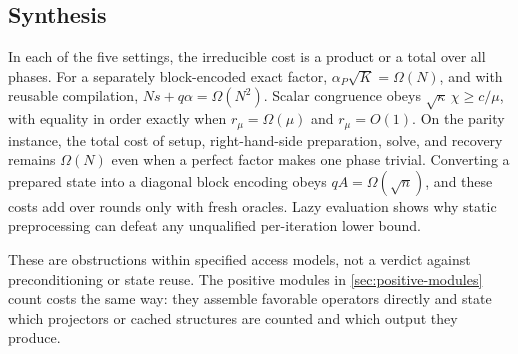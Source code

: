 \subsection{Synthesis}
\label{sec:preconditioning-synthesis}

In each of the five settings, the irreducible cost is a product or a total
over all phases.  For a separately
block-encoded exact factor, $\alpha_P\sqrt K=\Omega(N)$, and with reusable
compilation, $Ns+q\alpha=\Omega(N^2)$.  Scalar congruence
obeys $\sqrt\kappa\,\chi\geq c/\mu$, with equality in order exactly when
$r_\mu=\Omega(\mu)$ and $r_\mu=O(1)$.  On the parity instance, the total
cost of setup, right-hand-side preparation, solve, and recovery remains
$\Omega(N)$ even when a perfect factor makes one phase trivial.  Converting a
prepared state into a diagonal block encoding obeys $qA=\Omega(\sqrt n)$, and
these costs add over rounds only with fresh oracles.  Lazy
evaluation shows why static preprocessing can defeat any unqualified
per-iteration lower bound.

These are obstructions within specified access models, not a verdict against
preconditioning or state reuse.  The positive modules in
\cref{sec:positive-modules} count costs the same way: they assemble
favorable operators directly and state which projectors or cached structures
are counted and which output they produce.
